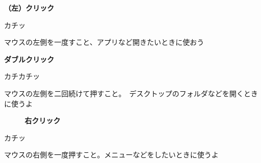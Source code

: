 \documentclass[a4paper,12pt]{jarticle}
\begin{document}
\begin{minipage}{\textwidth}
  \begin{minipage}{5.562cm}
    \centering
    \textbf{（左）クリック}
    \flushleft

    カチッ\\
    \centering

    \flushleft
    マウスの左側を一度すこと、アプリなど開きたいときに使おう
  \end{minipage}
  \begin{minipage}{5.562cm}
    \centering
    \textbf{ダブルクリック}
    \flushleft

    カチカチッ\\
    \centering


    \flushleft
    マウスの左側を二回続けて押すこと。　デスクトップのフォルダなどを開くときに使うよ
  \end{minipage}
  \begin{minipage}{5.562cm}
    \centering
    \textbf{~~~~~右クリック}
    \flushleft

    \hspace{3cm} カチッ\\
    \centering


    \flushleft
    マウスの右側を一度押すこと。メニューなどをしたいときに使うよ
  \end{minipage}
\end{minipage}
\end{document}
